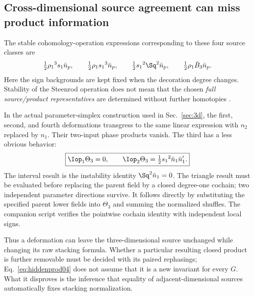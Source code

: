 \subsection{Cross-dimensional source agreement can miss product information}
The stable cohomology-operation expressions corresponding to these four source classes are
\begin{equation}\label{eq:stabletheta04}
\tfrac12{\rho_1}^3{s_1}\bar n_p,\qquad \tfrac12{\rho_1}{s_1}^3\bar n_p,\qquad
\tfrac12{s_1}^2\Sq^2\bar n_p,\qquad \tfrac12{\rho_1}\bar B_3\bar n_p.
\end{equation}
Here the sign backgrounds are kept fixed when the decoration degree changes. Stability of the Steenrod operation does not mean that the chosen \emph{full source/product representatives} are determined without further homotopies \cite{SteenrodEpstein,BrumfielMorgan}.

In the actual parameter-simplex construction used in Sec.~\ref{sec:3d}, the first, second, and fourth deformations transgress to the same linear expression with $n_2$ replaced by $n_1$. Their two-input phase products vanish. The third has a less obvious behavior:
\begin{equation}\label{eq:hiddenprod04}
\boxed{\Iop_1\Theta_3=0,\qquad
\Iop_2\Theta_3=\tfrac12{s_1}^2\bar n_1\bar n'_1.}
\end{equation}
The interval result is the instability identity $\Sq^2\bar n_1=0$. The triangle result must be evaluated before replacing the parent field by a closed degree-one cochain; two independent parameter directions survive. It follows directly by substituting the specified parent lower fields into $\Theta_3$ and summing the normalized shuffles. The companion script verifies the pointwise cochain identity with independent local signs.

Thus a deformation can leave the three-dimensional source unchanged while changing its raw stacking formula. Whether a particular resulting closed product is further removable must be decided with its paired rephasings; Eq.~\eqref{eq:hiddenprod04} does not assume that it is a new invariant for every $G$. What it disproves is the inference that equality of adjacent-dimensional sources automatically fixes stacking normalization.
